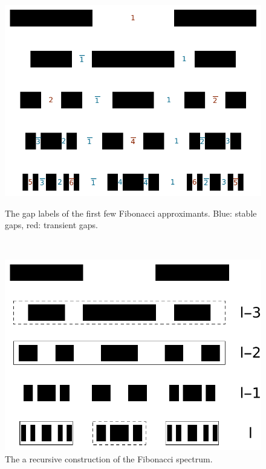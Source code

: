 \documentclass[a4paper]{jpconf}
\begin{document}
\begin{figure}[htp]
	\centering
	\begin{minipage}{0.4\textwidth}
		\centering
		\includegraphics[width=1.\textwidth]{img/gap_labels.pdf}
		\caption{\small {The gap labels of the first few Fibonacci approximants. Blue: stable gaps, red: transient gaps.}}
		\label{fig:fibogaps}
	\end{minipage}~~
	\begin{minipage}{0.4\textwidth}
		\centering
		\includegraphics[width=1.\textwidth]{img/recursive_construction_spectrum.pdf}
		\caption{\small{The a recursive construction of the Fibonacci spectrum.}}
		\label{fig:fibospec}
	\end{minipage}
\end{figure}
\end{document}
